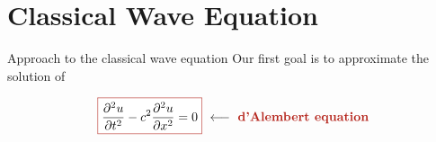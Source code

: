 \section{Classical Wave Equation}

\begin{frame}{Approach to the classical wave equation}
    Our first goal is to approximate the solution of

    \begin{equation*}
        \fcolorbox{BrickRed}{white}{$\displaystyle\frac{\partial^2u}{\partial t^2}-c^2\frac{\partial^2u}{\partial x^2}=0$} \ \longleftarrow \ \text{\textbf{\textcolor{BrickRed}{d'Alembert equation}}}
    \end{equation*}

    \vfill

    \pause

    
\end{frame}